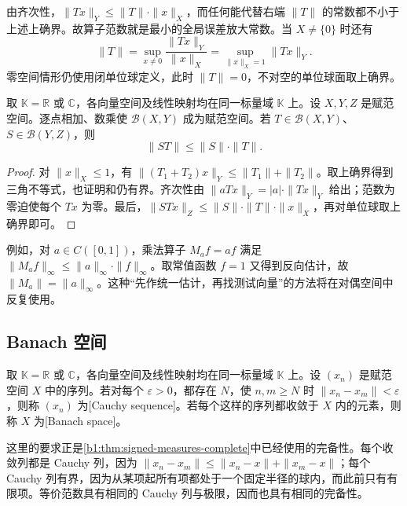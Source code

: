 由齐次性，\(\|Tx\|_Y\leq\|T\|\cdot\|x\|_X\)，而任何能代替右端 \(\|T\|\) 的常数都不小于上述上确界。故算子范数就是最小的全局误差放大常数。当 \(X\ne\{0\}\) 时还有
\[
\|T\|=\sup_{x\ne0}\dfrac{\|Tx\|_Y}{\|x\|_X}
=\sup_{\|x\|_X=1}\|Tx\|_Y.
\]
零空间情形仍使用闭单位球定义，此时 \(\|T\|=0\)，不对空的单位球面取上确界。

\begin{proposition}\label{b1:prop:operator-norm-properties}
取 \(\mathbb K=\mathbb R\) 或 \(\mathbb C\)，各向量空间及线性映射均在同一标量域 \(\mathbb K\) 上。设 \(X,Y,Z\) 是赋范空间。逐点相加、数乘使 \(\mathcal B(X,Y)\) 成为赋范空间。若 \(T\in\mathcal B(X,Y)\)、\(S\in\mathcal B(Y,Z)\)，则
\[
\|ST\|\leq\|S\|\cdot\|T\|.
\]
\end{proposition}
\begin{proof}
对 \(\|x\|_X\leq1\)，有
\(\|(T_1+T_2)x\|_Y\leq\|T_1\|+\|T_2\|\)。取上确界得到三角不等式，也证明和仍有界。齐次性由 \(\|aTx\|_Y=|a|\cdot\|Tx\|_Y\) 给出；范数为零迫使每个 \(Tx\) 为零。最后，\(\|STx\|_Z\leq\|S\|\cdot\|T\|\cdot\|x\|_X\)，再对单位球取上确界即可。
\end{proof}

例如，对 \(a\in C([0,1])\)，乘法算子 \(M_af=af\) 满足 \(\|M_af\|_\infty\leq\|a\|_\infty\cdot\|f\|_\infty\)。取常值函数 \(f=1\) 又得到反向估计，故 \(\|M_a\|=\|a\|_\infty\)。这种“先作统一估计，再找测试向量”的方法将在对偶空间中反复使用。

\subsection{Banach 空间}
\label{b1:subsec:080104}

\begin{definition}\label{b1:def:banach-space}
取 \(\mathbb K=\mathbb R\) 或 \(\mathbb C\)，各向量空间及线性映射均在同一标量域 \(\mathbb K\) 上。设 \((x_n)\) 是赋范空间 \(X\) 中的序列。若对每个 \(\varepsilon>0\)，都存在 \(N\)，使 \(n,m\geq N\) 时 \(\|x_n-x_m\|<\varepsilon\)，则称 \((x_n)\) 为[Cauchy sequence]。若每个这样的序列都收敛于 \(X\) 内的元素，则称 \(X\) 为[Banach space]。
\end{definition}

这里的要求正是\cref{b1:thm:signed-measures-complete}中已经使用的完备性。每个收敛列都是 Cauchy 列，因为 \(\|x_n-x_m\|\leq\|x_n-x\|+\|x_m-x\|\)；每个 Cauchy 列有界，因为从某项起所有项都处于一个固定半径的球内，而此前只有有限项。等价范数具有相同的 Cauchy 列与极限，因而也具有相同的完备性。

